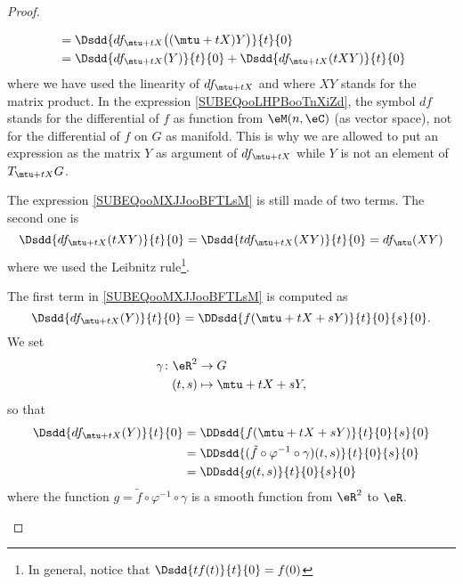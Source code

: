 \begin{proof}
\begin{subproof}
\begin{subequations}
\begin{align}
				                                  & =\Dsdd{ df_{\mtu+tX}\big( (\mtu+tX)Y \big) }{t}{0} \label{SUBEQooLHPBooTnXiZd}                 \\
				                                  & =\Dsdd{ df_{\mtu+tX}(Y) }{t}{0}+\Dsdd{ df_{\mtu+tX}(tXY) }{t}{0}   \label{SUBEQooMXJJooBFTLsM}
			\end{align}
		\end{subequations}
		where we have used the linearity of \( df_{\mtu+tX}\) and where \( XY\) stands for the matrix product. In the expression \eqref{SUBEQooLHPBooTnXiZd}, the symbol \( df\) stands for the differential of \( f\) as function from \( \eM(n,\eC)\) (as vector space), not for the differential of \( f\) on \( G\) as manifold. This is why we are allowed to put an expression as the matrix \( Y\) as argument of \( df_{\mtu+tX}\) while \( Y\) is not an element of \( T_{\mtu+tX}G\).

		The expression \eqref{SUBEQooMXJJooBFTLsM} is still made of two terms. The second one is
		\begin{equation}
			\Dsdd{ df_{\mtu+tX}(tXY) }{t}{0}=\Dsdd{ tdf_{\mtu+tX}(XY) }{t}{0}=df_{\mtu}(XY)
		\end{equation}
		where we used the Leibnitz rule\footnote{In general, notice that \( \Dsdd{ tf(t) }{t}{0}=f(0)\)}.

		The first term in \eqref{SUBEQooMXJJooBFTLsM} is computed as
		\begin{equation}
			\Dsdd{ df_{\mtu+tX}(Y) }{t}{0}=\DDsdd{ f(\mtu+tX+sY) }{t}{0}{s}{0}.
		\end{equation}
		We set
		\begin{equation}
			\begin{aligned}
				\gamma\colon \eR^2 & \to G               \\
				(t,s)              & \mapsto \mtu+tX+sY,
			\end{aligned}
		\end{equation}
		so that
		\begin{subequations}
			\begin{align}
				\Dsdd{ df_{\mtu+tX}(Y) }{t}{0} & =\DDsdd{ f(\mtu+tX+sY) }{t}{0}{s}{0}                               \\
				                               & =\DDsdd{ (\tilde f\circ\varphi^{-1}\circ\gamma)(t,s) }{t}{0}{s}{0} \\
				                               & =\DDsdd{ g(t,s) }{t}{0}{s}{0}
			\end{align}
		\end{subequations}
		where the function \( g=\tilde f\circ\varphi^{-1}\circ \gamma\) is a smooth function from \( \eR^2\) to \( \eR\).


\end{subproof}
\end{proof}
